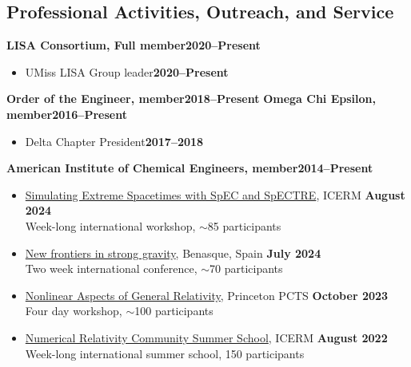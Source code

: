 \documentclass[margin,line]{res}
\begin{document}
\begin{resume}
	\section{\sc Professional Activities, Outreach, and Service}
	 {\bf LISA Consortium, Full member}\hfill{\bf 2020--Present}
	\begin{itemize}
		\item[] UMiss LISA Group leader\hfill{\bf 2020--Present}
	\end{itemize}
	{\bf Order of the Engineer, member}\hfill{\bf 2018--Present}
	{\bf Omega Chi Epsilon, member}\hfill{\bf 2016--Present}
	\vspace*{.05in}
	\begin{itemize}
		\item[ ] Delta Chapter President\hfill{\bf 2017--2018}
	\end{itemize}
	{\bf American Institute of Chemical Engineers, member}\hfill{\bf 2014--Present}\\
	\vspace*{.05in}
	\begin{itemize}
		\item[]
		      \href{https://icerm.brown.edu/topical_workshops/tw-24-ses/}
		      {Simulating Extreme Spacetimes with SpEC and SpECTRE},
		      ICERM \hfill {\bf August 2024} \\
		      \hspace*{1em} Week-long international workshop, $\sim$85 participants
		\item[]
		      \href{https://www.benasque.org/2024relativity/}
		      {New frontiers in strong gravity},
		      Benasque, Spain \hfill {\bf July 2024} \\
		      \hspace*{1em} Two week international conference, $\sim$70 participants
		\item[]
		      \href{https://pcts.princeton.edu/events/2023/nonlinear-aspects-general-relativity}
		      {Nonlinear Aspects of General Relativity},
		      Princeton PCTS \hfill {\bf October 2023}\\
		      \hspace*{1em} Four day workshop, $\sim$100 participants
		\item[]
		      \href{https://icerm.brown.edu/events/re-22-f20w1/}
		      {Numerical Relativity Community Summer School},
		      ICERM \hfill {\bf August 2022} \\
		      \hspace*{1em} Week-long international summer school, 150 participants

\end{itemize}
\end{resume}
\end{document}
